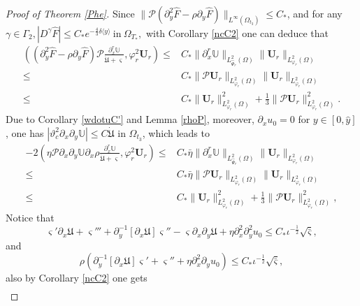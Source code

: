 \documentclass[10pt,a4paper]{amsart}
\newcommand\y{{{\langle y \rangle}}}
\begin{document}
\begin{proof}[Proof of Theorem \ref{Phe}]
Since $\|\mathcal{P}(\partial_{y}^{2}\hat{F}-\rho\partial_{y}\hat{F})\|_{L^{\infty}(\Omega_{t_{3}})}\leq C_{*}$,
and for any $\gamma\in\Gamma_{2}, |D^{\gamma}\hat{F}|\leq C_{*}e^{-\frac{4}{3}\delta\y}~\text{in}~\Omega_{T_{*}},$
with Corollary \ref{ncC2} one can deduce that
\begin{align}\label{J91}
\left((\partial_{y}^{2}\hat{F}-\rho\partial_{y}\hat{F})\mathcal{P}\frac{\partial_{x}^{r}\mathbb{U}}{\dot{\mathfrak{U}}+\varsigma},\varphi_{r}^{2}\mathbf{U}_{r}\right)
\leq& C_{*}\|\partial_{x}^{r}\mathbb{U}\|_{L_{\hat{\Psi}_{r}}^{2}(\Omega)}\|\mathbf{U}_{r}\|_{L_{\varphi_{r}}^{2}(\Omega)}\\
\leq& C_{*}\|\mathcal{P}\mathbf{U}_{r}\|_{L_{\varphi_{r}}^{2}(\Omega)}\|\mathbf{U}_{r}\|_{L_{\varphi_{r}}^{2}(\Omega)}\nonumber\\
\leq& C_{*}\|\mathbf{U}_{r}\|_{L_{\varphi_{r}}^{2}(\Omega)}^{2}
     +\frac{1}{3}\|\mathcal{P}\mathbf{U}_{r}\|_{L_{\varphi_{r}}^{2}(\Omega)}^{2}.\nonumber
\end{align}
Due to Corollary \ref{wdotuC'} and Lemma \ref{rhoP}, moreover, $\partial_{x}u_{0}=0$ for $y\in[0,\hat{y}]$, one has $|\vartheta_{c}^{2}\partial_{x}\partial_{y}\mathbb{U}|\leq C\dot{\mathfrak{U}}$ in $\Omega_{t_{3}}$, which leads to
\begin{align}\label{J92}
-2\left(\eta\mathcal{P}\partial_{x}\partial_{y}\mathbb{U}\partial_{x}\rho\frac{\partial_{x}^{r}\mathbb{U}}{\dot{\mathfrak{U}}+\varsigma},\varphi_{r}^{2}\mathbf{U}_{r}\right)
\leq& C_{*}\bar{\eta}\|\partial_{x}^{r}\mathbb{U}\|_{L_{\hat{\Psi}_{r}}^{2}(\Omega)}\|\mathbf{U}_{r}\|_{L_{\varphi_{r}}^{2}(\Omega)}\\
\leq& C_{*}\bar{\eta}\|\mathcal{P}\mathbf{U}_{r}\|_{L_{\varphi_{r}}^{2}(\Omega)}\|\mathbf{U}_{r}\|_{L_{\varphi_{r}}^{2}(\Omega)}\nonumber\\
\leq& C_{*}\|\mathbf{U}_{r}\|_{L_{\varphi_{r}}^{2}(\Omega)}^{2}
     +\frac{1}{3}\|\mathcal{P}\mathbf{U}_{r}\|_{L_{\varphi_{r}}^{2}(\Omega)}^{2},\nonumber
\end{align}
Notice that
$$\varsigma'\partial_{x}\mathfrak{U}+\varsigma'''+\partial_{y}^{-1}[\partial_{x}\mathfrak{U}]\varsigma''-\varsigma\partial_{x}\partial_{y}\mathfrak{U}+\eta\partial_{x}^{2}\partial_{y}^{2}u_{0}
\leq C_{*}\iota^{-\frac{1}{2}}\sqrt{\bar{\varsigma}},$$
and
$$\rho\left(\partial_{y}^{-1}[\partial_{x}\mathfrak{U}]\varsigma'+\varsigma''+\eta\partial_{x}^{2}\partial_{y}u_{0}\right)
\leq C_{*}\iota^{-\frac{1}{2}}\sqrt{\bar{\varsigma}},$$
also by Corollary \ref{ncC2} one gets
\begin{align}\label{J93}

\end{align}
\end{proof}
\end{document}
